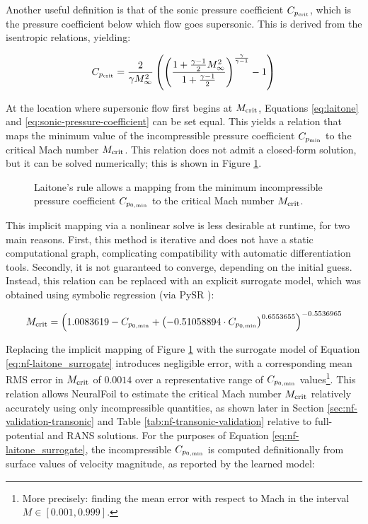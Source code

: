     Another useful definition is that of the sonic pressure coefficient $C_{p_{\rm crit}}$, which is the pressure coefficient below which flow goes supersonic. This is derived from the isentropic relations, yielding:

    \begin{equation}
        C_{p_{\rm crit}} = \frac{2}{\gamma M_\infty^{2}} \left(
        \left(
        \frac{1 + \frac{\gamma - 1}{2} M_\infty^{2}}{1 + \frac{\gamma - 1}{2}}
        \right)^{\frac{\gamma}{\gamma - 1}}
        - 1
        \right)
        \label{eq:sonic-pressure-coefficient}
    \end{equation}

    At the location where supersonic flow first begins at $M_{\rm crit}$, Equations \ref{eq:laitone} and \ref{eq:sonic-pressure-coefficient} can be set equal. This yields a relation that maps the minimum value of the incompressible pressure coefficient $C_{p_{\rm min}}$ to the critical Mach number $M_{\rm crit}$. This relation does not admit a closed-form solution, but it can be solved numerically; this is shown in Figure \ref{fig:compressibility_corrections}.

    \begin{figure}[h]
        \centering
        
        \caption{Laitone's rule allows a mapping from the minimum incompressible pressure coefficient $C_{p_{0,\rm min}}$ to the critical Mach number $M_{\rm crit}$.}
        \label{fig:compressibility_corrections}
    \end{figure}

    This implicit mapping via a nonlinear solve is less desirable at runtime, for two main reasons. First, this method is iterative and does not have a static computational graph, complicating compatibility with automatic differentiation tools. Secondly, it is not guaranteed to converge, depending on the initial guess. Instead, this relation can be replaced with an explicit surrogate model, which was obtained using symbolic regression (via PySR \cite{cranmer_interpretable_2023}):

    \begin{equation}
        M_{\rm crit} = \left(
        1.0083619
        - C_{p_{0,\rm min}}
        + \left(-0.51058894 \cdot C_{p_{0,\rm min}} \right)^{0.6553655}
        \right)^{-0.5536965}
        \label{eq:nf-laitone_surrogate}
    \end{equation}

    Replacing the implicit mapping of Figure \ref{fig:compressibility_corrections} with the surrogate model of Equation \ref{eq:nf-laitone_surrogate} introduces negligible error, with a corresponding mean RMS error in $M_{\rm crit}$ of $0.0014$ over a representative range of $C_{p_{0,\rm min}}$ values\footnote{More precisely: finding the mean error with respect to Mach in the interval $M\in[0.001, 0.999]$.}. This relation allows NeuralFoil to estimate the critical Mach number $M_{\rm crit}$ relatively accurately using only incompressible quantities, as shown later in Section \ref{sec:nf-validation-transonic} and Table \ref{tab:nf-transonic-validation} relative to full-potential and RANS solutions. For the purposes of Equation \ref{eq:nf-laitone_surrogate}, the incompressible $C_{p_{0,\rm min}}$ is computed definitionally from surface values of velocity magnitude, as reported by the learned model:

